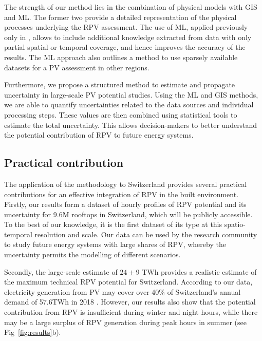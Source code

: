 The strength of our method lies in the combination of physical models with GIS and ML. The former two provide a detailed representation of the physical processes underlying the RPV assessment. The use of ML, applied previously only in \cite{assouline_quantifying_2017, assouline_large-scale_2018}, allows to include additional knowledge extracted from data with only partial spatial or temporal coverage, and hence improves the accuracy of the results. 
The ML approach also outlines a method to use sparsely available datasets for a PV assessment in other regions.

Furthermore, we propose a structured method to estimate and propagate uncertainty in large-scale PV potential studies. Using the ML and GIS methods, we are able to quantify uncertainties related to the data sources and individual processing steps. These values are then combined using statistical tools to estimate the total uncertainty.
This allows decision-makers to better understand the potential contribution of RPV to future energy systems. 


\subsection{Practical contribution}

The application of the methodology to Switzerland provides several practical contributions for an effective integration of RPV in the built environment. 
Firstly, our results form a dataset of hourly profiles of RPV potential and its uncertainty for 9.6M rooftops in Switzerland, which will be publicly accessible. To the best of our knowledge, it is the first dataset of its type at this spatio-temporal resolution and scale. Our data can be used by the research community to study future energy systems with large shares of RPV, whereby the uncertainty permits the modelling of different scenarios. 

Secondly, the large-scale estimate of $24 \pm 9$ TWh provides a realistic estimate of the maximum technical RPV potential for Switzerland. According to our data, electricity generation from PV may cover over 40\% of Switzerland's annual demand of 57.6TWh in 2018 \cite{swiss_federal_institue_for_energy_schweizerische_2018}. However, our results also show that the potential contribution from RPV is insufficient during winter and night hours, while there may be a large surplus of RPV generation during peak hours in summer (see Fig~\ref{fig:results}b).

